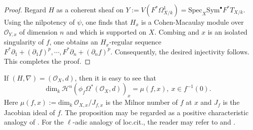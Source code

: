 \documentclass[12pt, a4paper]{article}
\begin{document}
\begin{proof}
Regard $H$ as a coherent sheaf on $Y:=V(F^*\Omega^1_{X/k})=\mathrm{Spec}_X\mathrm{Sym}^\bullet F^*T_{X/k}$. Using the nilpotency of $\psi$, one finds that $H_x$ is a Cohen-Macaulay module over $\mathcal O_{Y,x}$ of dimension $n$ and which is supported on $X$. Combing \cite[Lemma 10.103.3]{SP} and $x$ is an isolated singularity of $f$, one obtains an $H_x$-regular sequence $F^*\partial_1+(\partial_1f)^p,\cdots,F^*\partial_n+(\partial_nf)^p$. Consequently, the desired injectivity follows. This completes the proof.

\end{proof}
If $(H,\nabla)=(\mathcal O_X,d)$, then it is easy to see that
$$
\mathrm{dim}_k~\mathcal H^n(\phi_f\Omega^*(\mathcal O_X,d))_x=\mu(f,x),~x\in f^{-1}(0).
$$
Here $\mu(f,x):=\mathrm{dim}_k~\mathcal O_{X,x}/J_{f,x}$ is the Milnor number of $f$ at $x$ and $J_f$ is the Jacobian ideal of $f$. The proposition may be regarded as a positive characteristic analogy of \cite[Proposition 4.24 (i)]{Max}.
For the $\ell$-adic analogy of loc.cit., the reader may refer to \cite[\uppercase\expandafter{} 4.6]{IL03} and \cite[2.10]{SGA}.
\end{document}

